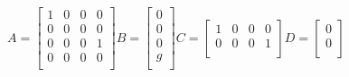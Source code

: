 \documentclass{article}
\begin{document}
\begin{equation}
	A = 
  	\begin{bmatrix}
  	1 & 0 & 0 & 0 \\ 
  	0 & 0 & 0 & 0 \\
  	0 & 0 & 0 & 1 \\ 
  	0 & 0 & 0 & 0 \\
  	\end{bmatrix}
  	B = 
  	\begin{bmatrix}
  	0 \\ 
  	0 \\ 
  	0 \\ 
  	g \\
  	\end{bmatrix}
  	C =
  	\begin{bmatrix}
  	1 & 0 & 0 & 0 \\ 
  	0 & 0 & 0 & 1 \\
  	\end{bmatrix}
  	D = 
  	\begin{bmatrix}
  	0 \\ 
  	0 \\
  	\end{bmatrix}
\end{equation}
\end{document}
